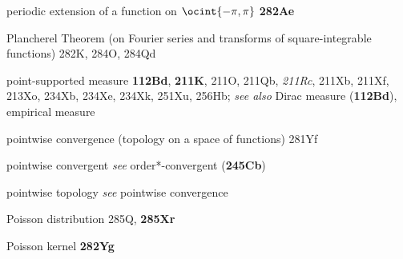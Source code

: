 







periodic extension of a function on $\ocint{-\pi,\pi}$ {\bf 282Ae}






































Plancherel Theorem (on Fourier series and transforms of
square-integrable functions) 282K, 284O, 284Qd















point-supported measure {\bf 112Bd},
  {\bf 211K}, 211O, 211Qb, {\it 211Rc}, 211Xb, 211Xf, 213Xo,
234Xb, 234Xe, 234Xk, 251Xu, 256Hb;
  {\it see also} Dirac measure ({\bf 112Bd}), empirical measure




pointwise convergence (topology on a space of functions)
281Yf






pointwise convergent 
  {\it see} order*-convergent ({\bf 245Cb})


pointwise topology {\it see} pointwise convergence


Poisson distribution 285Q, {\bf 285Xr}


Poisson kernel {\bf 282Yg}




